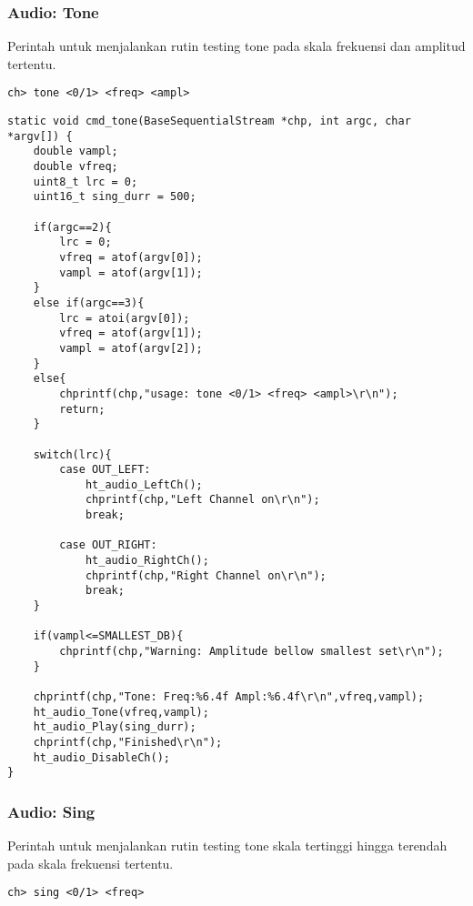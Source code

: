 \documentclass[12pt,]{article}
\begin{document}
	\subsubsection{Audio: Tone}
	Perintah untuk menjalankan rutin testing tone pada skala frekuensi dan amplitud tertentu.
	\begin{verbatim}
ch> tone <0/1> <freq> <ampl>
	\end{verbatim}

	\begin{verbatim}
static void cmd_tone(BaseSequentialStream *chp, int argc, char *argv[]) {
	double vampl;
	double vfreq;
	uint8_t lrc = 0;
	uint16_t sing_durr = 500;
	
	if(argc==2){
		lrc = 0;
		vfreq = atof(argv[0]);
		vampl = atof(argv[1]);
	}
	else if(argc==3){
		lrc = atoi(argv[0]);
		vfreq = atof(argv[1]);
		vampl = atof(argv[2]);
	}
	else{
		chprintf(chp,"usage: tone <0/1> <freq> <ampl>\r\n");
		return;
	}
	
	switch(lrc){
		case OUT_LEFT:
			ht_audio_LeftCh();
			chprintf(chp,"Left Channel on\r\n");
			break;
		
		case OUT_RIGHT:
			ht_audio_RightCh();
			chprintf(chp,"Right Channel on\r\n");
			break;
	}
	
	if(vampl<=SMALLEST_DB){
		chprintf(chp,"Warning: Amplitude bellow smallest set\r\n");
	}
	
	chprintf(chp,"Tone: Freq:%6.4f Ampl:%6.4f\r\n",vfreq,vampl);
	ht_audio_Tone(vfreq,vampl);
	ht_audio_Play(sing_durr);
	chprintf(chp,"Finished\r\n");
	ht_audio_DisableCh();
}
	\end{verbatim}
	
	\subsubsection{Audio: Sing}
	Perintah untuk menjalankan rutin testing tone skala tertinggi hingga terendah pada skala frekuensi tertentu.
	\begin{verbatim}
ch> sing <0/1> <freq>
	\end{verbatim}
	
\end{document}
